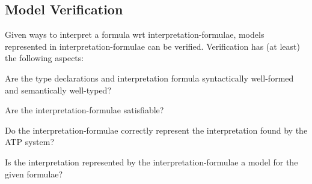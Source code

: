 \documentclass{easychair}
\newenvironment{packed_enumerate}{
\vspace*{-0.3em}
\begin{enumerate}
\setlength{\partopsep}{0pt}
\setlength{\itemsep}{1pt}
\setlength{\parskip}{0pt}
\setlength{\parsep}{0pt}
}{\end{enumerate}}
\begin{document}
\subsection{Model Verification}
\label{Verification}

Given ways to interpret a formula wrt interpretation-formulae, models represented in
interpretation-formulae can be verified.
Verification has (at least) the following aspects:
\begin{packed_enumerate}
\item Are the type declarations and interpretation formula syntactically well-formed 
      and semantically well-typed?
\item Are the interpretation-formulae satisfiable?
\item Do the interpretation-formulae correctly represent the interpretation found by the 
      ATP system?
\item Is the interpretation represented by the interpretation-formulae a model for the given 
      formulae?
\end{packed_enumerate}
\end{document}
